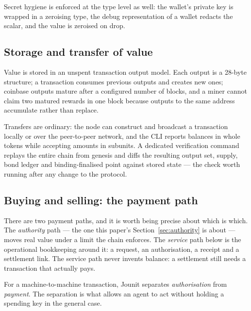 \documentclass{article}
\begin{document}
Secret hygiene is enforced at the type level as well: the wallet's private key
is wrapped in a zeroising type, the debug representation of a wallet redacts
the scalar, and the value is zeroised on drop.

\subsection{Storage and transfer of value}

Value is stored in an unspent transaction output model. Each output is a
28-byte structure; a transaction consumes previous outputs and creates new
ones; coinbase outputs mature after a configured number of blocks, and a
miner cannot claim two matured rewards in one block because outputs to the
same address accumulate rather than replace.

Transfers are ordinary: the node can construct and broadcast a transaction
locally or over the peer-to-peer network, and the CLI reports balances in whole
tokens while accepting amounts in subunits. A dedicated verification command
replays the entire chain from genesis and diffs the resulting output set,
supply, bond ledger and binding-finalised point against stored state --- the
check worth running after any change to the protocol.

\subsection{Buying and selling: the payment path}
\label{sec:payments}

There are two payment paths, and it is worth being precise about which is which.
The \emph{authority} path --- the one this paper's Section~\ref{sec:authority}
is about --- moves real value under a limit the chain enforces. The
\emph{service} path below is the operational bookkeeping around it: a request, an
authorisation, a receipt and a settlement link. The service path never invents
balance: a settlement still needs a transaction that actually pays.

For a machine-to-machine transaction, Jounit separates \emph{authorisation}
from \emph{payment}. The separation is what allows an agent to act without
holding a spending key in the general case.
\end{document}
